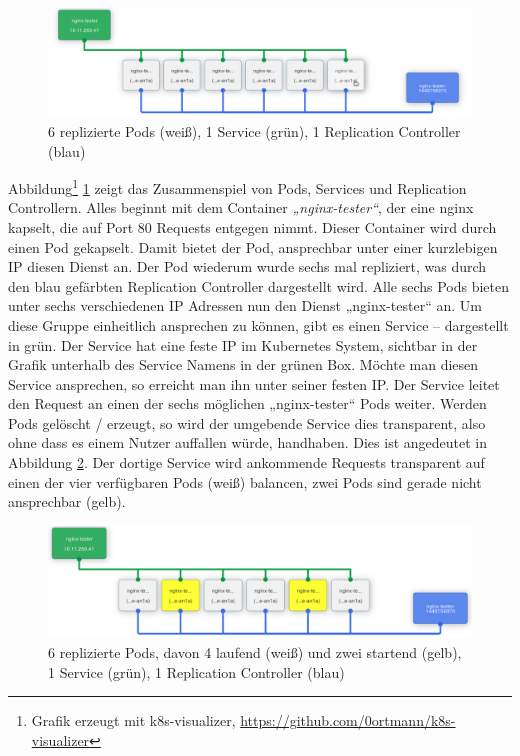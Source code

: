 \begin{figure}[h]
    \centering
    \includegraphics[scale=0.3]{img/pods-created-k8s.pdf}
    \caption{6 replizierte Pods (weiß), 1 Service (grün), 1 Replication Controller (blau)}
    \label{fig:k8s-pod-concept}
\end{figure}

Abbildung\footnote{Grafik erzeugt mit k8s-visualizer, \url{https://github.com/0ortmann/k8s-visualizer}} \ref{fig:k8s-pod-concept} zeigt das Zusammenspiel von Pods, Services und Replication Controllern. Alles beginnt mit dem Container \textit{„nginx-tester“}, der eine nginx kapselt, die auf Port 80 Requests entgegen nimmt. Dieser Container wird durch einen Pod gekapselt. Damit bietet der Pod, ansprechbar unter einer kurzlebigen IP diesen Dienst an. Der Pod wiederum wurde sechs mal repliziert, was durch den blau gefärbten Replication Controller dargestellt wird. Alle sechs Pods bieten unter sechs verschiedenen IP Adressen nun den Dienst „nginx-tester“ an. Um diese Gruppe einheitlich ansprechen zu können, gibt es einen Service -- dargestellt in grün. Der Service hat eine feste IP im Kubernetes System, sichtbar in der Grafik unterhalb des Service Namens in der grünen Box. Möchte man diesen Service ansprechen, so erreicht man ihn unter seiner festen IP. Der Service leitet den Request an einen der sechs möglichen „nginx-tester“ Pods weiter. Werden Pods gelöscht / erzeugt, so wird der umgebende Service dies transparent, also ohne dass es einem Nutzer auffallen würde, handhaben. Dies ist angedeutet in Abbildung \ref{fig:k8s-pod-starting}. Der dortige Service wird ankommende Requests transparent auf einen der vier verfügbaren Pods (weiß) balancen, zwei Pods sind gerade nicht ansprechbar (gelb).

\begin{figure}[h]
    \centering
    \includegraphics[scale=0.3]{img/pods-getting-ready-k8s.pdf}
    \caption{6 replizierte Pods, davon 4 laufend (weiß) und zwei startend (gelb), 1 Service (grün), 1 Replication Controller (blau)}
    \label{fig:k8s-pod-starting}
\end{figure}
